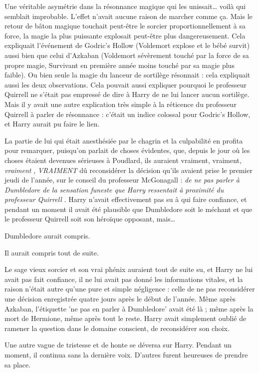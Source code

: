 Une véritable asymétrie dans la résonnance magique qui les unissait… voilà qui semblait improbable. L'effet n'avait aucune raison de marcher comme ça. Mais le retour de bâton magique touchait peut-être le sorcier proportionnellement à sa force, la magie la plus puissante explosait peut-être plus dangereusement. Cela expliquait l'événement de Godric's Hollow (Voldemort explose et le bébé survit) aussi bien que celui d'Azkaban (Voldemort sévèrement touché par la force de sa propre magie, Survivant en première année moins touché par sa magie plus faible). Ou bien seule la magie du lanceur de sortilège résonnait : cela expliquait aussi les deux observations. Cela pouvait aussi expliquer pourquoi le professeur Quirrell ne s'était pas empressé de dire à Harry de ne lui lancer aucun sortilège. Mais il y avait une autre explication très simple à la réticence du professeur Quirrell à parler de résonnance : c'était un indice colossal pour Godric's Hollow, et Harry aurait pu faire le lien.

La partie de lui qui était anesthésiée par le chagrin et la culpabilité en profita pour remarquer, puisqu'on parlait de choses évidentes, que, depuis le jour où les choses étaient devenues sérieuses à Poudlard, ils auraient vraiment, vraiment, \emph{vraiment} , \emph{VRAIMENT}  dû reconsidérer la décision qu'ils avaient prise le premier jeudi de l'année, sur le conseil du professeur McGonagall : \emph{de ne pas parler à Dumbledore de la sensation funeste que Harry ressentait à proximité du professeur Quirrell} . Harry n'avait effectivement pas su à qui faire confiance, et pendant un moment il avait été plausible que Dumbledore soit le méchant et que le professeur Quirrell soit son héroïque opposant, mais…

Dumbledore aurait compris.

Il aurait compris tout de suite.

Le sage vieux sorcier et son vrai phénix auraient tout de suite su, et Harry ne lui avait pas fait confiance, il ne lui avait pas donné les informations vitales, et la raison n'était autre qu'une pure et simple négligence : celle de ne pas reconsidérer une décision enregistrée quatre jours après le début de l'année. Même après Azkaban, l'étiquette 'ne pas en parler à Dumbledore' avait été là ; même après la mort de Hermione, même après tout le reste. Harry avait simplement oublié de ramener la question dans le domaine conscient, de reconsidérer son choix.

Une autre vague de tristesse et de honte se déversa sur Harry. Pendant un moment, il continua sans la dernière voix. D'autres furent heureuses de prendre sa place.

